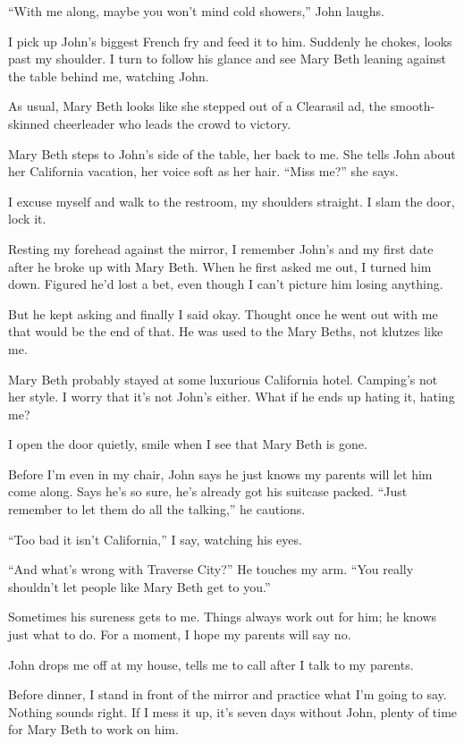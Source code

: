 \documentclass[twoside,10pt]{book}
\begin{document}
``With me along, maybe you won't mind cold showers,'' John laughs.

I pick up John's biggest French fry and feed it to him. Suddenly he
chokes, looks past my shoulder. I turn to follow his glance and see Mary
Beth leaning against the table behind me, watching John.

As usual, Mary Beth looks like she stepped out of a Clearasil ad, the
smooth-skinned cheer­leader who leads the crowd to victory.

Mary Beth steps to John's side of the table, her back to me. She tells
John about her California vacation, her voice soft as her hair. ``Miss
me?'' she says.

I excuse myself and walk to the restroom, my shoulders straight. I slam
the door, lock it.

Resting my forehead against the mirror, I remember John's and my first
date after he broke up with Mary Beth. When he first asked me out, I
turned him down. Figured he'd lost a bet, even though I can't picture
him losing anything.

But he kept asking and finally I said okay. Thought once he went out
with me that would be the end of that. He was used to the Mary Beths,
not klutzes like me.

Mary Beth probably stayed at some luxurious California hotel. Camping's
not her style. I worry that it's not John's either. What if he ends up
hating it, hating me?

I open the door quietly, smile when I see that Mary Beth is gone.

Before I'm even in my chair, John says he just knows my parents will let
him come along. Says he's so sure, he's already got his suitcase packed.
``Just remember to let them do all the talking,'' he cautions.

``Too bad it isn't California,'' I say, watching his eyes.

``And what's wrong with Traverse City?'' He touches my arm. ``You really
shouldn't let people like Mary Beth get to you.''

Sometimes his sureness gets to me. Things always work out for him; he
knows just what to do. For a moment, I hope my parents will say no.

John drops me off at my house, tells me to call after I talk to my
parents.

Before dinner, I stand in front of the mirror and practice what I'm
going to say. Nothing sounds right. If I mess it up, it's seven days
without John, plenty of time for Mary Beth to work on him.
\end{document}

